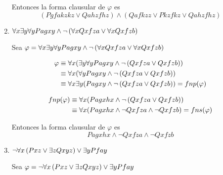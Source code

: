 \documentclass[11pt,letterpaper]{article}
\begin{document}
\begin{enumerate}
  Entonces la forma clausular de $\varphi$ es
  $$
  \left(Pgfakzkz \lor Qahzfhz\right) \land (Qafkzz \lor Pkzfkz\lor Qahzfhz)
  $$
  
\item $\forall x\exists y\forall y Pagxy \land \neg \left( \forall x Qxfza \lor \forall x Qxfzb\right)$

  \hfill\break
  Sea $\varphi = \forall x\exists y\forall y Pagxy \land \neg \left( \forall x Qxfza \lor \forall x Qxfzb\right)$
  
  \begin{align*}
    \varphi &\equiv
    \forall x(\exists y\forall y Pagxy \land \neg \left(Qxfza \lor Qxfzb\right))\\
    &\equiv
    \forall x(\forall y Pagxy \land \neg \left(Qxfza \lor Qxfzb\right))\\
    &\equiv
    \forall x\exists y (Pagxy \land \neg \left(Qxfza \lor Qxfzb\right)) = fnp(\varphi)
  \end{align*}

  \begin{align*}
    fnp(\varphi) &\equiv
    \forall x(Pagxhx \land \neg \left(Qxfza \lor Qxfzb\right))\\
    &\equiv
    \forall x(Pagxhx \land \neg Qxfza \land \neg Qxfzb) = fns(\varphi)
  \end{align*}

  Entonces la forma clausular de $\varphi$ es
  $$
  Pagxhx \land \neg Qxfza \land \neg Qxfzb
  $$
\item $\neg \forall x \left( Pxz \lor \exists z Qxyz\right) \lor \exists y Pfay$

  \hfill\break
  Sea $\varphi = \neg \forall x \left( Pxz \lor \exists z Qxyz\right) \lor \exists y Pfay$



\end{enumerate}
\end{document}
